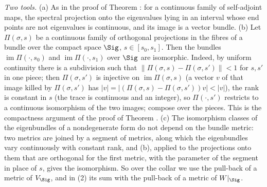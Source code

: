 \emph{Two tools.} (a) As in the proof of Theorem : for a continuous family of self-adjoint maps, the spectral projection onto the eigenvalues lying in an interval whose end points are not eigenvalues is continuous, and its image is a vector bundle. (b) Let $\Pi(\sigma, s)$ be a continuous family of orthogonal projections in the fibres of a bundle over the compact space $\Sig$, $s \in [s_{0}, s_{1}]$. Then the bundles $\operatorname{im}\Pi(\cdot, s_{0})$ and $\operatorname{im}\Pi(\cdot, s_{1})$ over $\Sig$ are isomorphic. Indeed, by uniform continuity there is a subdivision such that $\|\Pi(\sigma,s) - \Pi(\sigma,s')\| < 1$ for $s, s'$ in one piece; then $\Pi(\sigma,s')$ is injective on $\operatorname{im}\Pi(\sigma,s)$ (a vector $v$ of that image killed by $\Pi(\sigma,s')$ has $|v| = |(\Pi(\sigma,s) - \Pi(\sigma,s'))v| < |v|$), the rank is constant in $s$ (the trace is continuous and an integer), so $\Pi(\cdot,s')$ restricts to a continuous isomorphism of the two images; compose over the pieces. This is the compactness argument of the proof of Theorem . (c) The isomorphism classes of the eigenbundles of a nondegenerate form do not depend on the bundle metric: two metrics are joined by a segment of metrics, along which the eigenbundles vary continuously with constant rank, and (b), applied to the projections onto them that are orthogonal for the first metric, with the parameter of the segment in place of $s$, gives the isomorphism. So over the collar we use the pull-back of a metric of $V_{\Sig}$, and in (2) its sum with the pull-back of a metric of $W|_{\Sig}$.

